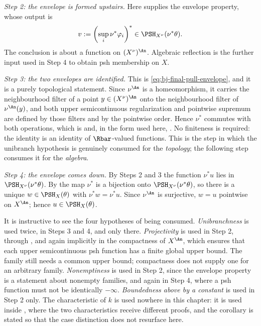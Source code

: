 \emph{Step 2: the envelope is formed upstairs.}  Here  supplies the envelope
property, whose output is
\[
 v:=\left(\sup_i\nu^*\varphi_i\right)^*
 \in\PSH_{X^\nu}(\nu^*\theta).
\]
The conclusion is about a function on $(X^\nu)^{\An}$.  Algebraic
reflection is the further input used in Step 4 to obtain psh membership on
$X$.

\emph{Step 3: the two envelopes are identified.}  This is
\eqref{eq:bj-final-pull-envelope}, and it is a purely topological statement.
Since $\nu^{\An}$ is a homeomorphism, it carries the neighbourhood filter
of a point $y\in(X^\nu)^{\An}$ onto the neighbourhood filter of
$\nu^{\An}(y)$, and both upper semicontinuous regularization and pointwise
supremum are defined by those filters and by the pointwise order.  Hence
$\nu^*$ commutes with both operations, which is
 and, in the form used here,
.  No finiteness is required: the identity is an
identity of $\Rbar$-valued functions.  This is the step in which the
unibranch hypothesis is genuinely consumed for the \emph{topology}; the
following step consumes it for the \emph{algebra}.

\emph{Step 4: the envelope comes down.}  By Steps 2 and 3 the function
$\nu^*u$ lies in $\PSH_{X^\nu}(\nu^*\theta)$.  By
 the map $\nu^*$ is a
bijection onto $\PSH_{X^\nu}(\nu^*\theta)$, so there is a unique
$w\in\PSH_X(\theta)$ with $\nu^*w=\nu^*u$.  Since $\nu^{\An}$ is
surjective, $w=u$ pointwise on $X^{\An}$; hence $u\in\PSH_X(\theta)$.

\begin{remark}
\label{rem:ch45-hypothesis-use}
It is instructive to see the four hypotheses of
 being consumed.
\emph{Unibranchness} is used twice, in Steps 3 and 4, and only there.
\emph{Projectivity} is used in Step 2, through
, and again implicitly in the compactness of
$X^{\An}$, which ensures that each upper semicontinuous psh function has a
finite global upper bound.  The family still needs a common upper bound;
compactness does not supply one for an arbitrary family.
\emph{Nonemptiness} is used in Step 2, since the envelope property is a
statement about nonempty families, and again in Step 4, where a psh function
must not be identically $-\infty$.
\emph{Boundedness above by a constant} is used in Step 2 only.  The
characteristic of $k$ is used nowhere in this chapter: it is used inside
, where the two
characteristics receive different proofs, and the corollary is stated so
that the case distinction does not resurface here.
\end{remark}

